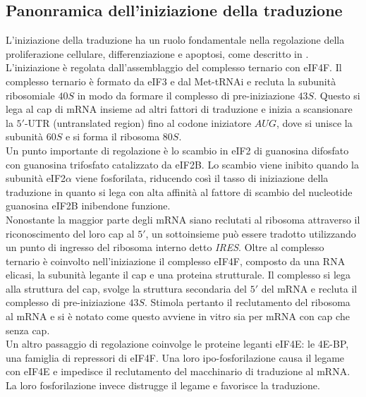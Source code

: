 	\subsection{Panonramica dell'iniziazione della traduzione}
	L'iniziazione della traduzione ha un ruolo fondamentale nella regolazione della proliferazione cellulare, differenziazione e apoptosi, come descritto in \cite{transconp53}.
	L'iniziazione \`e regolata dall'assemblaggio del complesso ternario con eIF4F.
	Il complesso ternario \`e formato da eIF3 e dal Met-tRNAi e recluta la subunit\`a ribosomiale $40S$ in modo da formare il complesso di pre-iniziazione $43S$.
	Questo si lega al cap di mRNA insieme ad altri fattori di traduzione e inizia a scansionare la $5'$-UTR (untranslated region) fino al codone iniziatore $AUG$, dove si unisce la subunit\`a $60S$ e si forma il ribosoma $80S$.\\
	Un punto importante di regolazione \`e lo scambio in eIF2 di guanosina difosfato con guanosina trifosfato catalizzato da eIF2B.
	Lo scambio viene inibito quando la subunit\`a eIF2$\alpha$ viene fosforilata, riducendo cos\`i il tasso di iniziazione della traduzione in quanto si lega con alta affinit\`a al fattore di scambio del nucleotide guanosina eIF2B inibendone funzione.\\
	Nonostante la maggior parte degli mRNA siano reclutati al ribosoma attraverso il riconoscimento del loro cap al $5'$, un sottoinsieme pu\`o essere tradotto utilizzando un punto di ingresso del ribosoma interno detto \emph{IRES}.
	Oltre al complesso ternario \`e coinvolto nell'iniziazione il complesso eIF4F, composto da una RNA elicasi, la subunit\`a legante il cap e una proteina strutturale.
	Il complesso si lega alla struttura del cap, svolge la struttura secondaria del $5'$ del mRNA e recluta il complesso di pre-iniziazione $43S$.
	Stimola pertanto il reclutamento del ribosoma al mRNA e si \`e notato come questo avviene in vitro sia per mRNA con cap che senza cap.\\
	Un altro passaggio di regolazione coinvolge le proteine leganti eIF4E: le 4E-BP, una famiglia di repressori di eIF4F.
	Una loro ipo-fosforilazione causa il legame con eIF4E e impedisce il reclutamento del macchinario di traduzione al mRNA.
	La loro fosforilazione invece distrugge il legame e favorisce la traduzione.

